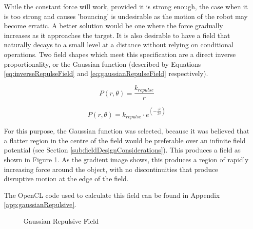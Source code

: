 \documentclass[10pt]{article}
\begin{document}
While the constant force will work, provided it is strong enough, the case when
it is too strong and causes 'bouncing' is undesirable as the motion of the robot
may become erratic. A better solution would be one where the force gradually
increases as it approaches the target. It is also desirable to have a field that
naturally decays to a small level at a distance without relying on conditional
operations. Two field shapes which meet this specification are a direct inverse
proportionality, or the Gaussian function (described by Equations
\ref{eq:inverseRepulseField} and \ref{eq:gaussianRepulseField} respectively).

\begin{equation}
P\left(r,\theta\right)=\frac{k_{repulse}}{r}\label{eq:inverseRepulseField}
\end{equation}

\begin{equation}
P\left(r,\theta\right)=k_{repulse}\cdot
e^{\left(-\frac{r^{2}}{2\sigma}\right)}\label{eq:gaussianRepulseField}
\end{equation}

For this purpose, the Gaussian function was selected, because it was believed
that a flatter region in the centre of the field would be preferable over an
infinite field potential (see Section \ref{sub:fieldDesignConsiderations}). This
produces a field as shown in Figure \ref{fig:gaussianField}. As the gradient
image shows, this produces a region of rapidly increasing force around the
object, with no discontinuities that produce disruptive motion at the edge of
the field.

The OpenCL code used to calculate this field can be found in Appendix
\ref{app:gaussianRepulsive}.

\begin{figure}
 \centering
 \caption{Gaussian Repulsive Field}
 \label{fig:gaussianField}
\end{figure}
\end{document}
